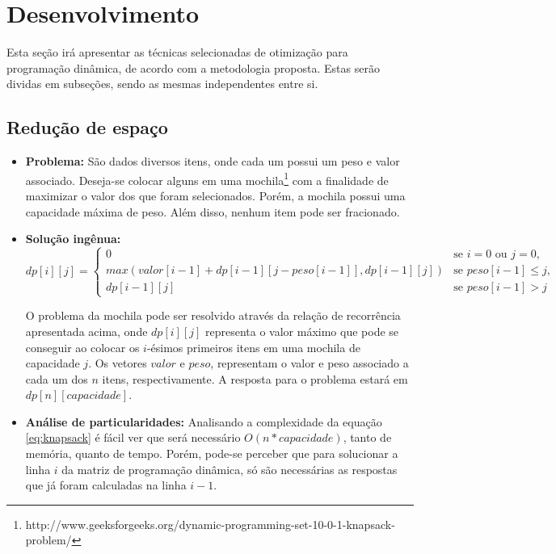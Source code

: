 \chapter{Desenvolvimento}
\label{chap:desenvolvimento}
\setcounter{lstlisting}{2}
\setcounter{equation}{2}
Esta seção irá apresentar as técnicas selecionadas de otimização para programação dinâmica, de acordo com a metodologia proposta. Estas serão dividas em subseções, sendo as mesmas independentes entre si.

\section{Redução de espaço}

\begin{itemize}[leftmargin=-.001in]
\item \textbf{Problema:}
 São dados diversos itens, onde cada um possui um peso e valor associado. Deseja-se colocar alguns em uma mochila\footnote{http://www.geeksforgeeks.org/dynamic-programming-set-10-0-1-knapsack-problem/} com a finalidade de maximizar o valor dos que foram selecionados. Porém, a mochila possui uma capacidade máxima de peso. Além disso, nenhum item pode ser fracionado.
 \\
\item \textbf{Solução ingênua:} 
\begin{equation}
dp[i][j] = 
\begin{cases}
0 &\text{se } i = 0 \text{ ou } j = 0,\\
max(valor[i-1] + dp[i-1][j-peso[i-1]], dp[i-1][j]) &\text{se } peso[i-1] \leq{j},\\
dp[i-1][j] &\text{se } peso[i-1] > j
\end{cases}
\label{eq:knapsack}
\end{equation}

O problema da mochila pode ser resolvido através da relação de recorrência apresentada acima, onde $dp[i][j]$ representa o valor máximo que pode se conseguir ao colocar os $i$-ésimos primeiros itens em uma mochila de capacidade $j$. Os vetores $valor$ e $peso$, representam o valor e peso associado a cada um dos $n$ itens, respectivamente. A resposta para o problema estará em $dp[n][capacidade]$.


\item \textbf{Análise de particularidades:}
Analisando a complexidade da equação \ref{eq:knapsack} é fácil ver que será necessário $O(n*capacidade)$, tanto de memória, quanto de tempo. Porém, pode-se perceber que para solucionar a linha $i$ da matriz de programação dinâmica, só são necessárias as respostas que já foram calculadas na linha $i - 1$.



\end{itemize}
